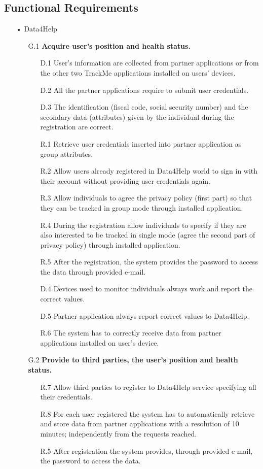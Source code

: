 \subsection{Functional Requirements}
\begin{enumerate}
\item[•]{\Large Data4Help}
	\begin{enumerate}
	\item [G.1] \textbf{Acquire user's position and health status.}
		\begin{enumerate}
		\item [D.1] User's information are collected from partner applications or from the other two TrackMe applications installed on users' devices.
		\item [D.2] All the partner applications require to submit user credentials.
		\item [D.3] The identification (fiscal code, social security number) and the secondary data (attributes) given by the individual during the registration are correct.
		\item [R.1] Retrieve user credentials inserted into partner application as group attributes.
		\item [R.2] Allow users already registered in Data4Help world to sign in with their account without providing user credentials again.
		\item [R.3] Allow individuals to agree the privacy policy (first part) so that they can be tracked in group mode through installed application.  
		\item [R.4] During the registration allow individuals to specify if they are also interested to be tracked in single mode (agree the second part of privacy policy) through installed application.
		\item [R.5] After the registration, the system provides the password to access the data through provided e-mail. 
		\item [D.4] Devices used to monitor individuals always work and report 			the correct values.	
    	\item [D.5] Partner application always report correct values to Data4Help.
    	\item [R.6] The system has to correctly receive data from partner applications installed on user's device.
    	\end{enumerate}	
    	
    \item [G.2] \textbf{Provide to third parties, the user's position and health status.}
    	\begin{enumerate} 
    	\item [R.7] Allow third parties to register to Data4Help service specifying all their credentials.
    	\item [R.8] For each user registered the system has to automatically retrieve and store data from partner applications with a resolution of 10 minutes; independently from the requests reached.
    	\item [R.5] After registration the system provides, through provided e-mail, the password to access the data.
    	\end{enumerate}	
		

\end{enumerate}
\end{enumerate}
